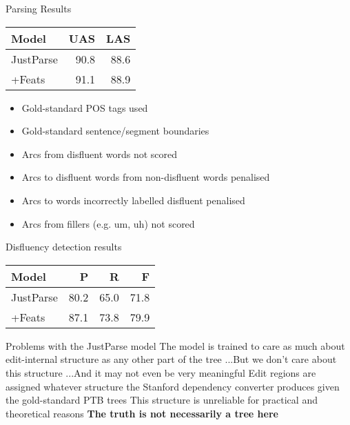 \documentclass{lecture}
\begin{document}
\begin{plain}{Parsing Results}
    \begin{table}
    \begin{tabular}{l|rr}
        \hline
        Model      & UAS   & LAS \\
        \hline \hline
        JustParse   & 90.8 & 88.6    \\
        +Feats      & 91.1 & 88.9    \\
        \hline
    \end{tabular}
    \centering
\end{table}
\begin{itemize}
    \item Gold-standard POS tags used
    \item Gold-standard sentence/segment boundaries
    \item Arcs from disfluent words not scored
    \item Arcs to disfluent words from non-disfluent words penalised
    \item Arcs to words incorrectly labelled disfluent penalised
    \item Arcs from fillers (e.g. um, uh) not scored
\end{itemize}
\end{plain}

\begin{plain}{Disfluency detection results}
    \begin{table}
    \begin{tabular}{l|rrr}
        \hline
        Model         & P    & R     & F \\
        \hline \hline
        JustParse     & 80.2     & 65.0  & 71.8  \\
        +Feats        & 87.1 & 73.8  & 79.9 \\
        \hline
    \end{tabular}
    \centering
\end{table}
\end{plain}

\begin{points}{Problems with the JustParse model}
\p The model is trained to care as much about edit-internal structure as any other
   part of the tree
\p ...But we don't care about this structure
\p ...And it may not even be very meaningful
\p Edit regions are assigned whatever structure the Stanford dependency converter
   produces given the gold-standard PTB trees
\p This structure is unreliable for practical and theoretical reasons
\p \textbf{The truth is not necessarily a tree here}
\end{points}
\end{document}
